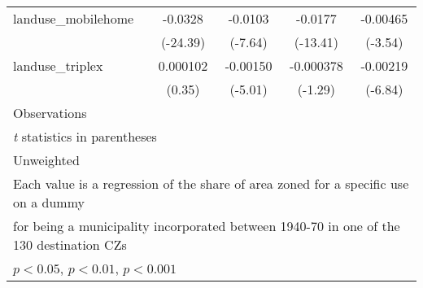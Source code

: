 \begin{table}[htbp]
\begin{tabular}{l*{4}{c}}
\addlinespace
landuse\_mobilehome  &     -0.0328\sym{***}&     -0.0103\sym{***}&     -0.0177\sym{***}&    -0.00465\sym{***}\\
                    &    (-24.39)         &     (-7.64)         &    (-13.41)         &     (-3.54)         \\
\addlinespace
landuse\_triplex     &    0.000102         &    -0.00150\sym{***}&   -0.000378         &    -0.00219\sym{***}\\
                    &      (0.35)         &     (-5.01)         &     (-1.29)         &     (-6.84)         \\
\midrule
Observations        &                     &                     &                     &                     \\
\bottomrule
\multicolumn{5}{l}{\footnotesize \textit{t} statistics in parentheses}\\
\multicolumn{5}{l}{\footnotesize Unweighted}\\
\multicolumn{5}{l}{\footnotesize Each value is a regression of the share of area zoned for a specific use on a dummy}\\
\multicolumn{5}{l}{\footnotesize for being a municipality incorporated between 1940-70 in one of the 130 destination CZs}\\
\multicolumn{5}{l}{\footnotesize \sym{*} \(p<0.05\), \sym{**} \(p<0.01\), \sym{***} \(p<0.001\)}\\
\end{tabular}
\end{table}
